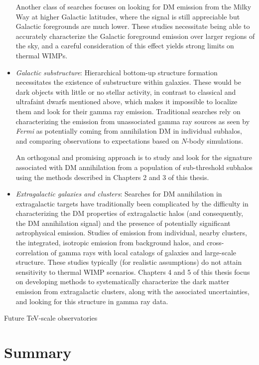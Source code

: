 \begin{itemize}
Another class of searches focuses on looking for DM emission from the Milky Way at higher Galactic latitudes, where the signal is still appreciable but Galactic foregrounds are much lower. These studies necessitate being able to accurately characterize the Galactic foreground emission over larger regions of the sky, and a careful consideration of this effect yields strong limits on thermal WIMPs.

\item \emph{Galactic substructure}: Hierarchical bottom-up structure formation necessitates the existence of substructure within galaxies. These would be dark objects with little or no stellar activity, in contrast to classical and ultrafaint dwarfs mentioned above, which makes it impossible to localize them and look for their gamma ray emission. Traditional searches rely on characterizing the emission from unassociated gamma ray sources as seen by \emph{Fermi} as potentially coming from annihilation DM in individual subhalos, and comparing observations to expectations based on $N$-body simulations.

An orthogonal and promising approach is to study and look for the signature associated with DM annihilation from a population of sub-threshold subhalos using the methods described in Chapters 2 and 3 of this thesis. 

\item \emph{Extragalactic galaxies and clusters}: Searches for DM annihilation in extragalactic targets have traditionally been complicated by the difficulty in characterizing the DM properties of extragalactic halos (and consequently, the DM annihilation signal) and the presence of potentially significant astrophysical emission. Studies of emission from individual, nearby clusters, the integrated, isotropic emission from background halos, and cross-correlation of gamma rays with local catalogs of galaxies and large-scale structure. These studies typically (for realistic assumptions) do not attain sensitivity to thermal WIMP scenarios. Chapters 4 and 5 of this thesis focus on developing methods to systematically characterize the dark matter emission from extragalactic clusters, along with the associated uncertainties, and looking for this structure in gamma ray data. 
\end{itemize}

Future TeV-scale observatories

\section{Summary}
\label{sec:summary}



